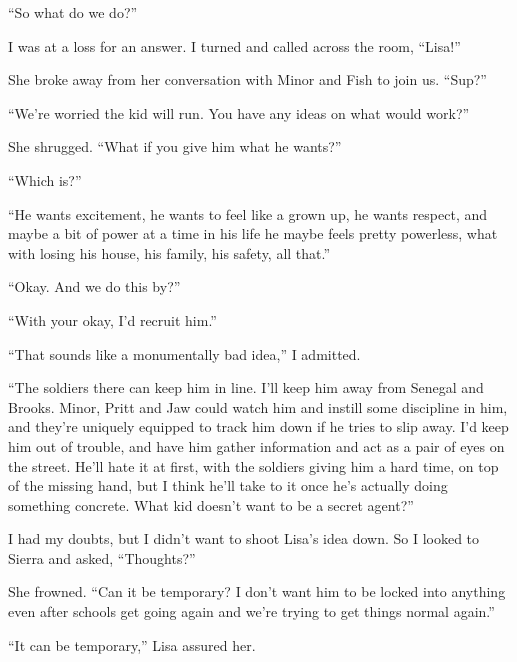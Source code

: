 ``So what do we do?''



I was at a loss for an answer.  I turned and called across the room, ``Lisa!''



She broke away from her conversation with Minor and Fish to join us.  ``Sup?''



``We're worried the kid will run.  You have any ideas on what would work?''



She shrugged. ``What if you give him what he wants?''



``Which is?''



``He wants excitement, he wants to feel like a grown up, he wants respect, and maybe a bit of power at a time in his life he maybe feels pretty powerless, what with losing his house, his family, his safety, all that.''



``Okay.  And we do this by?''



``With your okay, I'd recruit him.''



``That sounds like a monumentally bad idea,'' I admitted.



``The soldiers there can keep him in line.  I'll keep him away from Senegal and Brooks.  Minor, Pritt and Jaw could watch him and instill some discipline in him, and they're uniquely equipped to track him down if he tries to slip away.  I'd keep him out of trouble, and have him gather information and act as a pair of eyes on the street.  He'll hate it at first, with the soldiers giving him a hard time, on top of the missing hand, but I think he'll take to it once he's actually doing something concrete.  What kid doesn't want to be a secret agent?''



I had my doubts, but I didn't want to shoot Lisa's idea down.  So I looked to Sierra and asked, ``Thoughts?''



She frowned.  ``Can it be temporary?  I don't want him to be locked into anything even after schools get going again and we're trying to get things normal again.''



``It can be temporary,'' Lisa assured her.



